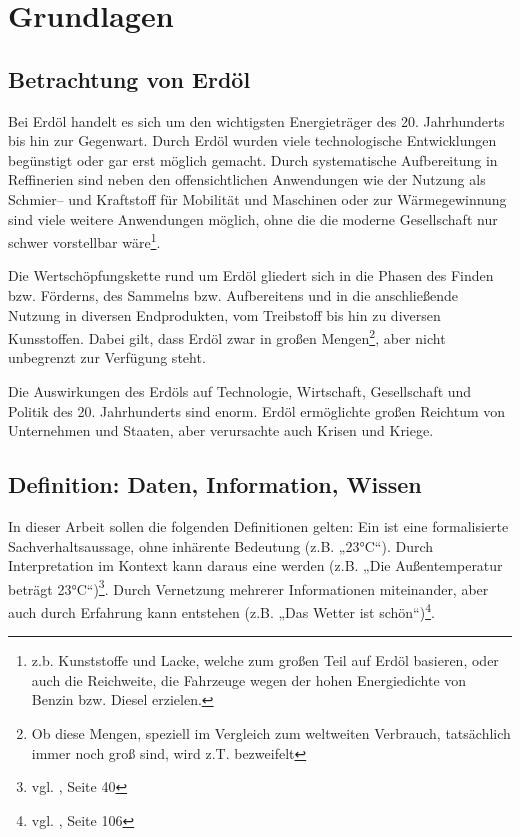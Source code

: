 \section{Grundlagen}
\label{sec:grundlagen}

\subsection{Betrachtung von Erdöl}

Bei Erdöl handelt es sich um den wichtigsten Energieträger des 20. Jahrhunderts bis hin zur Gegenwart. Durch Erdöl wurden viele technologische Entwicklungen begünstigt oder gar erst möglich gemacht. Durch systematische Aufbereitung in Reffinerien sind neben den offensichtlichen Anwendungen wie der Nutzung als Schmier-- und Kraftstoff für Mobilität und Maschinen oder zur Wärmegewinnung sind viele weitere Anwendungen möglich, ohne die die moderne Gesellschaft nur schwer vorstellbar wäre\footnote{z.b. Kunststoffe und Lacke, welche zum großen Teil auf Erdöl basieren, oder auch die Reichweite, die Fahrzeuge wegen der hohen Energiedichte von Benzin bzw. Diesel erzielen.}.

Die Wertschöpfungskette rund um Erdöl gliedert sich in die Phasen des Finden bzw. Förderns, des Sammelns bzw. Aufbereitens und in die anschließende Nutzung in diversen Endprodukten, vom Treibstoff bis hin zu diversen Kunsstoffen.
Dabei gilt, dass Erdöl zwar in großen Mengen\footnote{Ob diese Mengen, speziell im Vergleich zum weltweiten Verbrauch, tatsächlich immer noch groß sind, wird z.T. bezweifelt}, aber nicht unbegrenzt zur Verfügung steht. 

Die Auswirkungen des Erdöls auf Technologie, Wirtschaft, Gesellschaft und Politik des 20. Jahrhunderts sind enorm. Erdöl ermöglichte großen Reichtum von Unternehmen und Staaten, aber verursachte auch Krisen und Kriege.

\subsection{Definition: Daten, Information, Wissen}
\label{defwissen}

In dieser Arbeit sollen die folgenden Definitionen gelten: Ein  ist eine formalisierte Sachverhaltsaussage, ohne inhärente Bedeutung (z.B. „23°C“). Durch Interpretation im Kontext kann daraus eine  werden (z.B. „Die Außentemperatur beträgt 23°C“)\footnote{vgl. \cite{kfk}, Seite 40}. Durch Vernetzung mehrerer Informationen miteinander, aber auch durch Erfahrung kann  entstehen (z.B. „Das Wetter ist schön“)\footnote{vgl. \cite{pnik}, Seite 106}. 

